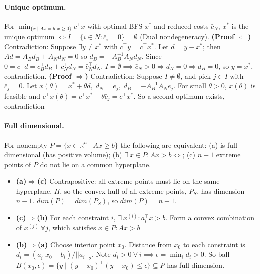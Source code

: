 \documentclass{article}
\begin{document}
\paragraph{Unique optimum.}
For $\min_{\{x \mid Ax=b, x\geq0\}} c^\top x$ with optimal BFS $x^*$ and reduced costs $\bar c_N$,
$x^*$ is the unique optimum $\iff I=\{i\in N : \bar c_i=0\}=\emptyset$ (Dual nondegeneracy).
\textbf{(Proof $\Leftarrow$)} Contradiction: 
Suppose $\exists y\neq x^*$ with $c^\top y=c^\top x^*$.  
Let $d=y-x^*$; then $Ad=A_Bd_B + A_Nd_N=0$ so $d_B = -A_B^{-1}A_N d_N$. 
Since $0 = c^\top d  = c_B^\top d_B + c_N^\top d_N = \bar c_N^\top d_N$. 
$I=\emptyset \implies \bar c_N>0\Rightarrow d_N=0\Rightarrow d_B=0$, so $y=x^*$, contradiction.
\textbf{(Proof $\Rightarrow$)} Contradiction:
Suppose $I\neq\emptyset$, and pick $j\in I$ with $\bar c_j=0$. Let $x(\theta)=x^*+\theta d,\; d_N=e_j,\; d_B=-A_B^{-1}A_N e_j$. 
For small $\theta>0$, $x(\theta)$ is feasible and $c^\top x(\theta)=c^\top x^*+\theta\bar c_j=c^\top x^*$. So a second optimum exists, contradiction



\paragraph{Full dimensional.} For nonempty $P=\{x \in \mathbb R^n \mid Ax\geq b\}$ the following are equivalent: (a) is full dimensional (has positive volume); (b) $\exists\ x\in P: Ax > b \iff$; (c) $n+1$ extreme points of $P$ do not lie on a common hyperplane. 
\begin{itemize}
    \item \textbf{(a)$\Rightarrow$(c)} Contrapositive: all extreme points must lie on the same hyperplane, $H$, so the convex hull of all extreme points, $P_S$, has dimension $n-1$. $dim(P) = dim(P_S)$, so $dim(P)=n-1$.
    \item \textbf{(c)$\Rightarrow$(b)} For each constraint $i$, $\exists\ x^{(i)}: a_i^\top x > b$. Form a convex combination of $x^{(j)}\ \forall j$, which satisfies $x\in P: Ax > b$
    \item \textbf{(b)$\Rightarrow$(a)} Choose interior point $x_0$. Distance from $x_0$ to each constraint is $d_i = (a_i^\top x_0 - b_i)/||a_i||_2$. Note $d_i > 0\ \forall\ i \implies \epsilon = \min_i d_i > 0$. So ball $B(x_0,\epsilon) = \{y\mid (y - x_0)^\top(y-x_0) \leq \epsilon\} \subseteq P$ has full dimension.
\end{itemize}
  
\end{document}
